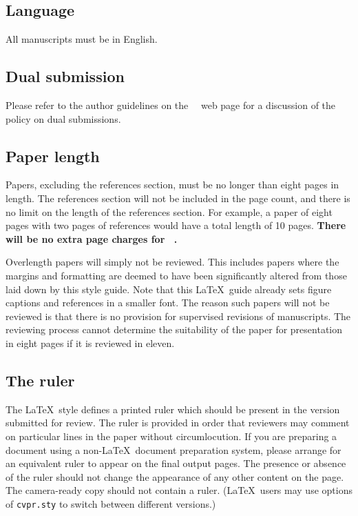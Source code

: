 

\subsection{Language}

All manuscripts must be in English.

\subsection{Dual submission}

Please refer to the author guidelines on the \confName\ \confYear\ web page for a
discussion of the policy on dual submissions.

\subsection{Paper length}
Papers, excluding the references section, must be no longer than eight pages in length.
The references section will not be included in the page count, and there is no limit on the length of the references section.
For example, a paper of eight pages with two pages of references would have a total length of 10 pages.
{\bf There will be no extra page charges for \confName\ \confYear.}

Overlength papers will simply not be reviewed.
This includes papers where the margins and formatting are deemed to have been significantly altered from those laid down by this style guide.
Note that this \LaTeX\ guide already sets figure captions and references in a smaller font.
The reason such papers will not be reviewed is that there is no provision for supervised revisions of manuscripts.
The reviewing process cannot determine the suitability of the paper for presentation in eight pages if it is reviewed in eleven.

\subsection{The ruler}
The \LaTeX\ style defines a printed ruler which should be present in the version submitted for review.
The ruler is provided in order that reviewers may comment on particular lines in the paper without circumlocution.
If you are preparing a document using a non-\LaTeX\ document preparation system, please arrange for an equivalent ruler to appear on the final output pages.
The presence or absence of the ruler should not change the appearance of any other content on the page.
The camera-ready copy should not contain a ruler.
(\LaTeX\ users may use options of \texttt{cvpr.sty} to switch between different versions.)

